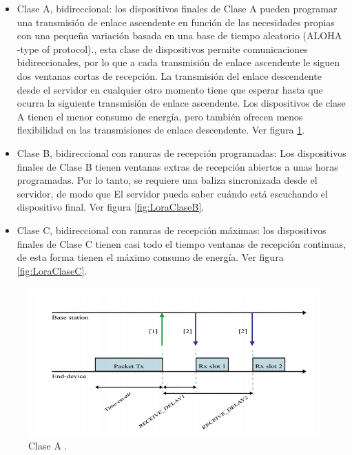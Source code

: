 \begin{itemize}
    \item Clase A, bidireccional: los dispositivos finales de Clase A pueden programar una transmisión de enlace ascendente en función de las necesidades propias con una pequeña variación basada en una base de tiempo aleatorio (ALOHA -type of protocol)., esta clase de dispositivos permite comunicaciones bidireccionales, por lo que a cada transmisión de enlace ascendente le siguen dos ventanas cortas de recepción. La transmisión del enlace descendente desde el servidor en cualquier otro momento tiene que esperar hasta que ocurra la siguiente transmisión de enlace ascendente. Los dispositivos de clase A tienen el menor consumo de energía, pero también ofrecen menos flexibilidad en las transmisiones de enlace descendente. Ver figura \ref{fig:LoraclassA}.

    \item Clase B, bidireccional con ranuras de recepción programadas: Los dispositivos finales de Clase B  tienen ventanas extras de recepción  abiertos a unas horas programadas. Por lo tanto, se requiere una baliza sincronizada desde el servidor, de modo que
    El servidor pueda saber cuándo está escuchando el dispositivo final. Ver figura \ref{fig:LoraClaseB}.
    
    \item Clase C, bidireccional con ranuras de recepción máximas: los dispositivos finales de Clase C tienen casi todo el tiempo ventanas de recepción continuas, de esta forma tienen el máximo consumo de energía. Ver figura \ref{fig:LoraClaseC}.
\end{itemize}


\begin{figure}[b]
	\centering
	\includegraphics[scale=.65]{./Figures/LoraclassA.PNG}
	\caption{Clase A \cite{Ruano2016}.}
	\label{fig:LoraclassA}
\end{figure}

